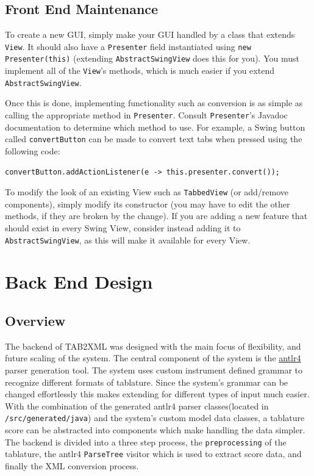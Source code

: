 \documentclass[11pt]{article}
\begin{document}
\subsection{Front End Maintenance}
\label{sec:orgecf5114}
To create a new GUI, simply make your GUI handled by a class that extends \texttt{View}.  It should also have a \texttt{Presenter} field instantiated using \texttt{new Presenter(this)} (extending \texttt{AbstractSwingView} does this for you).  You must implement all of the \texttt{View}'s methods, which is much easier if you extend \texttt{AbstractSwingView}.

Once this is done, implementing functionality such as conversion is as simple as calling the appropriate method in \texttt{Presenter}.  Consult \texttt{Presenter}'s Javadoc documentation to determine which method to use.  For example, a Swing button called \texttt{convertButton} can be made to convert text tabs when pressed using the following code:
\begin{verbatim}
convertButton.addActionListener(e -> this.presenter.convert());
\end{verbatim}

To modify the look of an existing View such as \texttt{TabbedView} (or add/remove components), simply modify its constructor (you may have to edit the other methods, if they are broken by the change).  If you are adding a new feature that should exist in every Swing View, consider instead adding it to \texttt{AbstractSwingView}, as this will make it available for every View.

\newpage

\section{Back End Design}
\label{sec:org7eb136e}
\subsection{Overview}
\label{sec:orgda02ef8}
The backend of TAB2XML was designed with the main focus of flexibility, and future scaling of the system. The central component of the system is the \href{https://www.antlr.org/}{antlr4} parser generation tool. The system uses custom instrument defined grammar to recognize different formats of tablature. Since the system's grammar can be changed effortlessly this makes extending for different types of input much easier. With the combination of the generated antlr4 parser classes(located in \texttt{/src/generated/java}) and the system's custom model data classes, a tablature score can be abstracted into components which make handling the data simpler. The backend is divided into a three step process, the \texttt{preprocessing} of the tablature, the antlr4 \texttt{ParseTree} visitor which is used to extract score data, and finally the XML conversion process.
\end{document}
